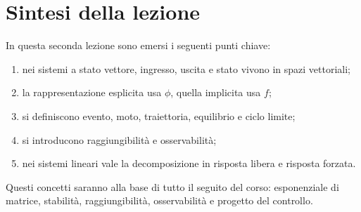 \section{Sintesi della lezione}

In questa seconda lezione sono emersi i seguenti punti chiave:
\begin{enumerate}
    \item nei sistemi a stato vettore, ingresso, uscita e stato vivono in spazi vettoriali;
    \item la rappresentazione esplicita usa $\phi$, quella implicita usa $f$;
    \item si definiscono evento, moto, traiettoria, equilibrio e ciclo limite;
    \item si introducono raggiungibilità e osservabilità;
    \item nei sistemi lineari vale la decomposizione in risposta libera e risposta forzata.
\end{enumerate}

Questi concetti saranno alla base di tutto il seguito del corso: esponenziale di matrice, stabilità, raggiungibilità, osservabilità e progetto del controllo.